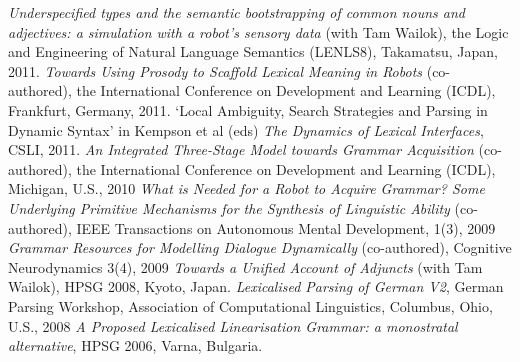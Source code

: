 \documentclass[a4paper]{article}
\begin{document}
{\em Underspecified types and the semantic bootstrapping of common nouns and adjectives: a simulation with a robot's sensory data} (with Tam Wailok), the Logic and Engineering of Natural Language Semantics (LENLS8), Takamatsu, Japan, 2011.\smallskip\newline
{\em Towards Using Prosody to Scaffold Lexical Meaning in Robots} (co-authored), the International Conference on Development and Learning (ICDL), Frankfurt, Germany, 2011.\smallskip\newline
`Local Ambiguity, Search Strategies and Parsing in Dynamic Syntax' in
Kempson et al (eds) {\em The Dynamics of Lexical Interfaces}, CSLI, 2011.\smallskip\newline
{\em An Integrated Three-Stage Model towards Grammar Acquisition} (co-authored), the International Conference on Development and Learning (ICDL), Michigan, U.S., 2010\smallskip\newline
{\em What is Needed for a Robot to Acquire Grammar? Some Underlying Primitive Mechanisms for the Synthesis of Linguistic Ability} (co-authored), IEEE Transactions on Autonomous Mental Development, 1(3), 2009\smallskip\newline
{\em Grammar Resources for Modelling Dialogue Dynamically} (co-authored), Cognitive Neurodynamics 3(4), 2009\smallskip\newline
{\em Towards a Unified Account of Adjuncts} (with Tam Wailok), HPSG 2008, Kyoto, Japan.\smallskip\newline
{\em Lexicalised Parsing of German V2}, German Parsing Workshop, Association of Computational Linguistics, Columbus, Ohio, U.S., 2008\smallskip\newline
{\em A Proposed Lexicalised Linearisation Grammar: a monostratal alternative}, HPSG 2006, Varna, Bulgaria.\smallskip\newline
\end{document}
